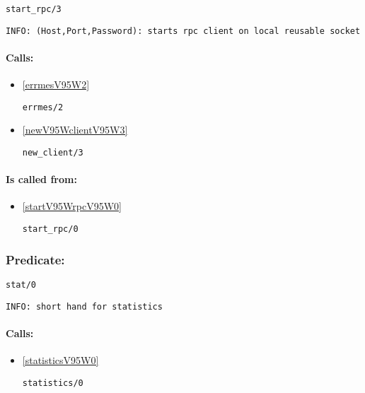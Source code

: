 \begin{verbatim}
start_rpc/3
\end{verbatim}

{\small \begin{verbatim}
INFO: (Host,Port,Password): starts rpc client on local reusable socket

\end{verbatim}}
\paragraph{Calls:} 
\begin{itemize}
\item \ref{errmesV95W2} 
\begin{verbatim}
errmes/2
\end{verbatim}

\item \ref{newV95WclientV95W3} 
\begin{verbatim}
new_client/3
\end{verbatim}

\end{itemize}
\paragraph{Is called from:} 
\begin{itemize}
\item \ref{startV95WrpcV95W0} 
\begin{verbatim}
start_rpc/0
\end{verbatim}

\end{itemize}

\subsubsection{Predicate:} \label{statV95W0}

\begin{verbatim}
stat/0
\end{verbatim}

{\small \begin{verbatim}
INFO: short hand for statistics

\end{verbatim}}
\paragraph{Calls:} 
\begin{itemize}
\item \ref{statisticsV95W0} 
\begin{verbatim}
statistics/0
\end{verbatim}

\end{itemize}

